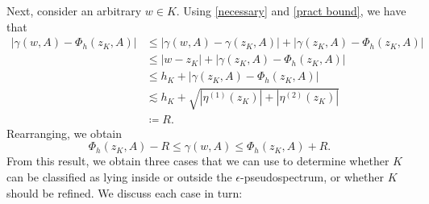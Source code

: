 Next, consider an arbitrary $w \in K.$ Using \eqref{necessary} and \eqref{pract bound}, we have that
\begin{align}
    | \gamma(w, A) - \Phi_h(z_K, A)| &\le |\gamma(w, A) - \gamma(z_K, A) | + | \gamma(z_K, A) - \Phi_h(z_K, A) |\\
    & \le |w-z_K| + | \gamma(z_K, A) - \Phi_h(z_K, A) | \\
    &\le h_K + | \gamma(z_K, A) - \Phi_h(z_K, A) |\\
    & \lesssim h_K + \sqrt{|\eta^{(1)}(z_K)|+|\eta^{(2)}(z_K)|} \\ 
    &\coloneqq R. \label{R}
\end{align}
Rearranging, we obtain
\begin{equation}
    \Phi_h(z_K, A) - R \le \gamma(w, A) \le \Phi_h(z_K, A) + R.
\end{equation}
From this result, we obtain three cases that we can use to determine whether $K$ can be classified as lying inside or outside the $\epsilon$-pseudospectrum, or whether $K$ should be refined. We discuss each case in turn:
